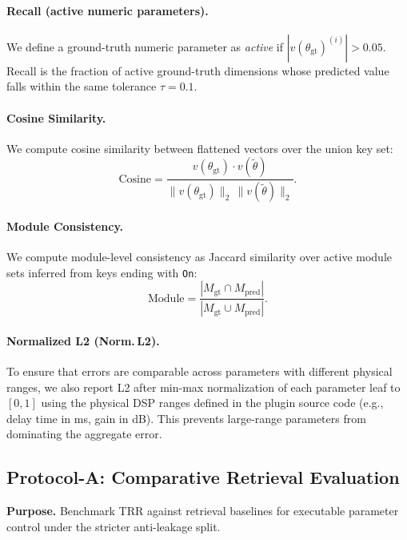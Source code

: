 \paragraph{Recall (active numeric parameters).}
We define a ground-truth numeric parameter as \emph{active} if $\left|v(\theta_{\text{gt}})^{(i)}\right|>0.05$. Recall is the fraction of active ground-truth dimensions whose predicted value falls within the same tolerance $\tau=0.1$.

\paragraph{Cosine Similarity.}
We compute cosine similarity between flattened vectors over the union key set:
\begin{equation}
		\text{Cosine} = \frac{v(\theta_{\text{gt}})\cdot v(\tilde{\theta})}{\|v(\theta_{\text{gt}})\|_2\,\|v(\tilde{\theta})\|_2}.
\end{equation}

\paragraph{Module Consistency.}
We compute module-level consistency as Jaccard similarity over active module sets inferred from keys ending with \texttt{On}:
\begin{equation}
	\text{Module} = \frac{|M_{\text{gt}} \cap M_{\text{pred}}|}{|M_{\text{gt}} \cup M_{\text{pred}}|}.
\end{equation}

\paragraph{Normalized L2 (Norm.\,L2).}
To ensure that errors are comparable across parameters with different physical ranges, we also report L2 after min-max normalization of each parameter leaf to $[0,1]$ using the physical DSP ranges defined in the plugin source code (e.g., delay time in ms, gain in dB). This prevents large-range parameters from dominating the aggregate error.

\subsection{Protocol-A: Comparative Retrieval Evaluation}
\label{ssec:protocolA}

\textbf{Purpose.} Benchmark TRR against retrieval baselines for executable parameter control under the stricter anti-leakage split.

